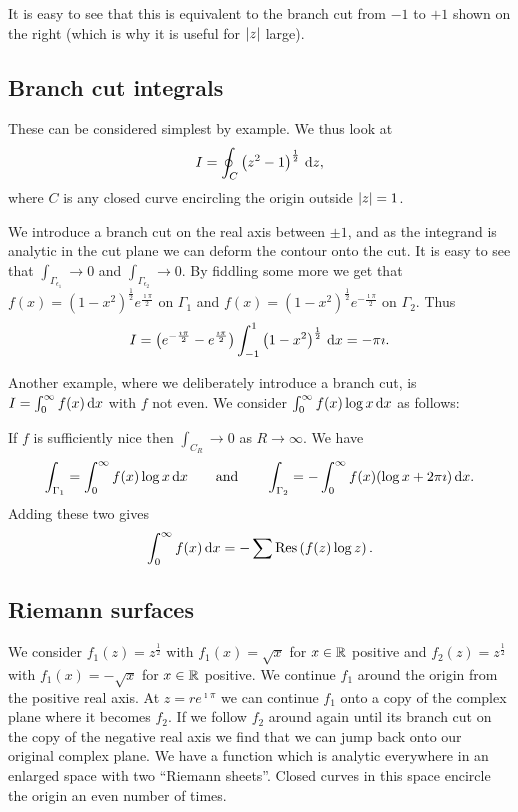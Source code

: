 \documentclass{notes}
\newcommand{\Res}{\mathrm{Res}}
\theoremstyle{plain}
\begin{document}
It is easy to see that this is equivalent to the branch cut from
$-1$ to $+1$ shown on the right (which is why it is useful for $\left|z\right|$
large).

\subsection{Branch cut integrals}

These can be considered simplest by example.  We thus look at
\[
I = \oint_C \left(z^2 - 1\right)^{\frac{1}{2}}\,\mathrm{d} z, 
\]
where $C$ is any closed curve encircling the origin outside $\left|z\right| = 1$.

We introduce a branch cut on the real axis between $\pm 1$, and as the
integrand is analytic in the cut plane we can deform the contour onto the
cut.  It is easy to see that $\int_{\Gamma_{\epsilon_1}} \to 0$
and $\int_{\Gamma_{\epsilon_2}} \to 0$.  By fiddling some more
we get that $f(x) = (1-x^2)^{\frac{1}{2}} e^{\frac{\imath \pi}{2}}$
on $\Gamma_1$ and $f(x) = (1-x^2)^{\frac{1}{2}} e^{-\frac{\imath \pi}{2}}$
on $\Gamma_2$.  Thus
\[
I = \left( e^{-\frac{\imath \pi}{2}} - e^{\frac{\imath \pi}{2}}
 \right) \int_{-1}^1 \left( 1-x^2 \right)^{\frac{1}{2}}\, \mathrm{d} x = - \pi \imath.
\]

Another example, where we deliberately introduce a branch cut, is
$I = \int_0^\infty f(x)\, \mathrm{d} x$ with $f$ not even.  We consider
$\int_0^\infty f(x) \log x\, \mathrm{d} x$ as follows:

If $f$ is sufficiently nice then $\int_{C_R} \to 0$ as $R \to \infty$.
We have 
\[
\int_{\Gamma_1} = \int_0^\infty f(x) \log x\, \mathrm{d} x \qquad \text{and} \qquad
\int_{\Gamma_2} = - \int_0^\infty f(x) (\log x + 2 \pi \imath)\, \mathrm{d} x.
\]
Adding these two gives
\[
\int_0^\infty f(x)\, \ud x = - \sum \Res \left( f(z) \log z \right).
\]

\subsection{Riemann surfaces}

We consider $f_1(z) = z^{\frac{1}{2}}$ with $f_1(x) = \sqrt{x}$ for
$x \in \mathbb{R}$ positive and $f_2(z) = z^{\frac{1}{2}}$ with $f_1(x) = -\sqrt{x}$
for $x \in \mathbb{R}$ positive.  We continue $f_1$ around the origin from the
positive real axis.  At $z = r e^{\imath \pi}$ we can continue $f_1$ onto
a copy of the complex plane where it becomes $f_2$.  If we follow $f_2$
around again until its branch cut on the copy of the negative real axis
we find that we can jump back onto our original complex plane.  We
have a function which is analytic everywhere in an enlarged space with
two ``Riemann sheets''.  Closed curves in this space encircle the origin an
even number of times.
\end{document}
